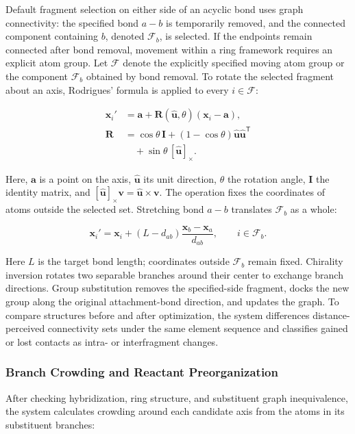 Default fragment selection on either side of an acyclic bond uses graph connectivity: the specified bond $a-b$ is temporarily removed, and the connected component containing $b$, denoted $\mathcal{F}_b$, is selected. If the endpoints remain connected after bond removal, movement within a ring framework requires an explicit atom group. Let $\mathcal{F}$ denote the explicitly specified moving atom group or the component $\mathcal{F}_b$ obtained by bond removal. To rotate the selected fragment about an axis, Rodrigues' formula is applied to every $i\in\mathcal{F}$:

\begin{equation}\label{eq:methods-02}
\begin{aligned}
\mathbf{x}_i'&=\mathbf{a}+\mathbf{R}(\hat{\mathbf{u}},\theta)(\mathbf{x}_i-\mathbf{a}),\\
\mathbf{R}&=\cos\theta\,\mathbf{I}+(1-\cos\theta)\hat{\mathbf{u}}\hat{\mathbf{u}}^{\mathsf{T}}\\
&\quad+\sin\theta\,[\hat{\mathbf{u}}]_\times.
\end{aligned}
\end{equation}

Here, $\mathbf{a}$ is a point on the axis, $\hat{\mathbf{u}}$ its unit direction, $\theta$ the rotation angle, $\mathbf{I}$ the identity matrix, and $[\hat{\mathbf{u}}]_\times \mathbf{v}=\hat{\mathbf{u}}\times\mathbf{v}$. The operation fixes the coordinates of atoms outside the selected set. Stretching bond $a-b$ translates $\mathcal{F}_b$ as a whole:

\begin{equation}\label{eq:methods-03}
\mathbf{x}_i'=\mathbf{x}_i+(L-d_{ab})\frac{\mathbf{x}_b-\mathbf{x}_a}{d_{ab}},\qquad i\in\mathcal{F}_b.
\end{equation}

Here $L$ is the target bond length; coordinates outside $\mathcal{F}_b$ remain fixed. Chirality inversion rotates two separable branches around their center to exchange branch directions. Group substitution removes the specified-side fragment, docks the new group along the original attachment-bond direction, and updates the graph. To compare structures before and after optimization, the system differences distance-perceived connectivity sets under the same element sequence and classifies gained or lost contacts as intra- or interfragment changes.

\subsubsection{Branch Crowding and Reactant Preorganization}
After checking hybridization, ring structure, and substituent graph inequivalence, the system calculates crowding around each candidate axis from the atoms in its substituent branches:


